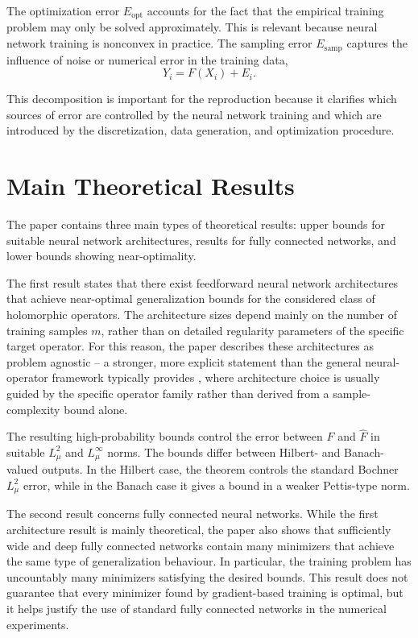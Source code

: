 The optimization error $E_{\mathrm{opt}}$ accounts for the fact that the
empirical training problem may only be solved approximately. This is relevant because neural network training is nonconvex in practice. The sampling error $E_{\mathrm{samp}}$ captures the influence of noise or numerical error in the training data,
\[
    Y_i = F(X_i) + E_i.
\]

This decomposition is important for the reproduction because it clarifies which sources of error are controlled by the neural network training and which are introduced by the discretization, data generation, and optimization procedure.

\section{Main Theoretical Results}

The paper contains three main types of theoretical results: upper bounds for suitable neural network architectures, results for fully connected networks, and lower bounds showing near-optimality.

The first result states that there exist feedforward neural network
architectures that achieve near-optimal generalization bounds for the considered class of holomorphic operators. The architecture sizes depend mainly on the number of training samples $m$, rather than on detailed regularity parameters of the specific target operator. For this reason, the paper describes these architectures as problem agnostic -- a stronger, more explicit statement than the general neural-operator framework typically provides \cite{kovachki2023neuraloperator}, where architecture choice is usually guided by the specific operator family rather than derived from a sample-complexity bound alone.

The resulting high-probability bounds control the error between $F$ and
$\widehat{F}$ in suitable $L^2_\mu$ and $L^\infty_\mu$ norms. The bounds differ between Hilbert- and Banach-valued outputs. In the Hilbert case, the theorem controls the standard Bochner $L^2_\mu$ error, while in the Banach case it gives a bound in a weaker Pettis-type norm.

The second result concerns fully connected neural networks. While the first architecture result is mainly theoretical, the paper also shows that sufficiently wide and deep fully connected networks contain many minimizers that achieve the same type of generalization behaviour. In particular, the training problem has uncountably many minimizers satisfying the desired bounds. This result does not guarantee that every minimizer found by gradient-based training is optimal, but it helps justify the use of standard fully connected networks in the numerical
experiments.

